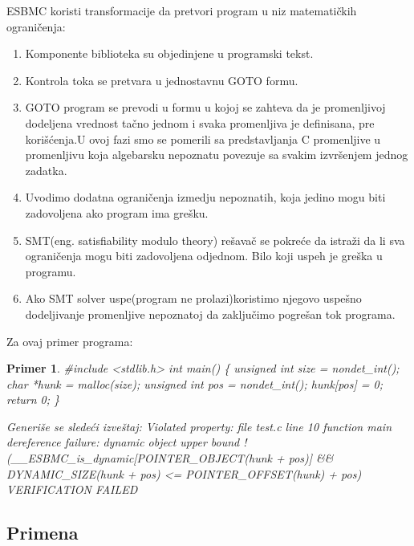 \documentclass[a4paper]{article}
\newtheorem{primer}{Primer}[section]
\begin{document}
\newline
ESBMC  koristi transformacije  da pretvori program u niz matematičkih ograničenja:
\begin{enumerate}
\item Komponente biblioteka su objedinjene u programski tekst.
\item Kontrola toka se pretvara u jednostavnu GOTO formu.
\item GOTO program se prevodi u formu  u kojoj se zahteva da je promenljivoj dodeljena vrednost tačno jednom i svaka promenljiva je definisana, pre korišćenja.U ovoj fazi smo se pomerili sa predstavljanja C promenljive u promenljivu koja algebarsku nepoznatu povezuje sa svakim izvršenjem jednog zadatka.
\item Uvodimo dodatna ograničenja izmedju nepoznatih, koja jedino mogu biti zadovoljena ako program ima grešku.
\item SMT(eng. satisﬁability modulo theory) rešavač se pokreće da istraži da li sva ograničenja mogu biti zadovoljena odjednom. Bilo koji uspeh je greška u programu.
\item Ako SMT solver uspe(program ne prolazi)koristimo njegovo uspešno dodeljivanje promenljive nepoznatoj da zaključimo pogrešan tok programa.
\end{enumerate}
Za ovaj primer programa:
\newline
\begin{primer}

\newline \#include  <stdlib.h>  
\newline
int main()
\newline
\{
\newline
	 unsigned int size = nondet_int();
\newline
	char *hunk = malloc(size); 
	\newline
	unsigned int pos = nondet_int(); 
	\newline
	hunk[pos] = 0; return 0;
	\newline
\}


Generiše se sledeći izveštaj:
\newline
Violated property: file test.c line 10 function main dereference failure: dynamic object upper bound !(\_\_ESBMC\_is\_dynamic[POINTER\_OBJECT(hunk + pos)] \&\& DYNAMIC\_SIZE(hunk + pos) <= POINTER\_OFFSET(hunk) + pos) VERIFICATION FAILED
\end{primer}


\subsection{Primena}
\label{subsec:Primena}
\end{document}
